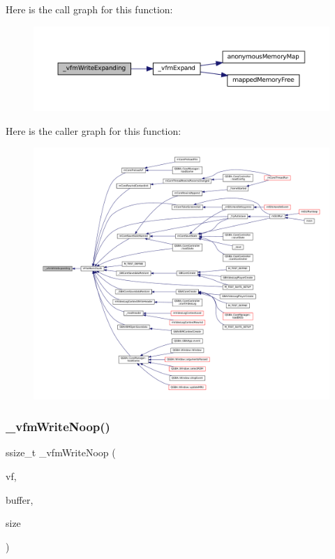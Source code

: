 Here is the call graph for this function\+:
\nopagebreak
\begin{figure}[H]
\begin{center}
\leavevmode
\includegraphics[width=350pt]{vfs-mem_8c_af41215a641c6a686b6d1e725a959b7c3_cgraph}
\end{center}
\end{figure}
Here is the caller graph for this function\+:
\nopagebreak
\begin{figure}[H]
\begin{center}
\leavevmode
\includegraphics[width=350pt]{vfs-mem_8c_af41215a641c6a686b6d1e725a959b7c3_icgraph}
\end{center}
\end{figure}
\mbox{\label{vfs-mem_8c_afac142894089fc65408a65e519c5bcb7}} 
\subsubsection{\texorpdfstring{\+\_\+vfm\+Write\+Noop()}{\_vfmWriteNoop()}}
{\footnotesize\ttfamily ssize\+\_\+t \+\_\+vfm\+Write\+Noop (\begin{DoxyParamCaption}\item[{struct V\+File $\ast$}]{vf,  }\item[{const void $\ast$}]{buffer,  }\item[{size\+\_\+t}]{size }\end{DoxyParamCaption})\hspace{0.3cm}{\ttfamily [static]}}

